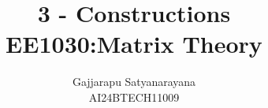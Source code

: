 \documentclass[journal]{IEEEtran}
\begin{document}

\vspace{3cm}

\title{
3 - Constructions \\
\large EE1030:Matrix Theory
}
\author{Gajjarapu Satyanarayana\\AI24BTECH11009
}
{\let\newpage\relax\maketitle}

\renewcommand{\thefigure}{\theenumi}
\renewcommand{\thetable}{\theenumi}



\renewcommand{\thetable}{\theenumi}
\end{document}
